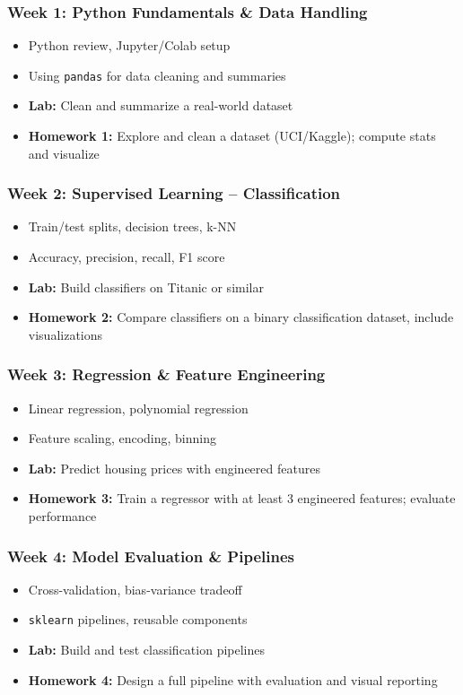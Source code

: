 \documentclass[12pt]{article}
\begin{document}
\subsubsection*{Week 1: Python Fundamentals \& Data Handling}
\begin{itemize}
  \item Python review, Jupyter/Colab setup
  \item Using \texttt{pandas} for data cleaning and summaries
  \item \textbf{Lab:} Clean and summarize a real-world dataset
  \item \textbf{Homework 1:} Explore and clean a dataset (UCI/Kaggle); compute stats and visualize
\end{itemize}

\subsubsection*{Week 2: Supervised Learning -- Classification}
\begin{itemize}
  \item Train/test splits, decision trees, k-NN
  \item Accuracy, precision, recall, F1 score
  \item \textbf{Lab:} Build classifiers on Titanic or similar
  \item \textbf{Homework 2:} Compare classifiers on a binary classification dataset, include visualizations
\end{itemize}

\subsubsection*{Week 3: Regression \& Feature Engineering}
\begin{itemize}
  \item Linear regression, polynomial regression
  \item Feature scaling, encoding, binning
  \item \textbf{Lab:} Predict housing prices with engineered features
  \item \textbf{Homework 3:} Train a regressor with at least 3 engineered features; evaluate performance
\end{itemize}

\subsubsection*{Week 4: Model Evaluation \& Pipelines}
\begin{itemize}
  \item Cross-validation, bias-variance tradeoff
  \item \texttt{sklearn} pipelines, reusable components
  \item \textbf{Lab:} Build and test classification pipelines
  \item \textbf{Homework 4:} Design a full pipeline with evaluation and visual reporting
\end{itemize}
\end{document}
